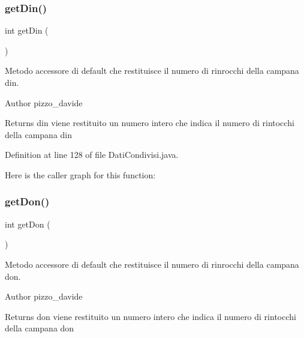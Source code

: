 \subsubsection{\texorpdfstring{get\+Din()}{getDin()}}
{\footnotesize\ttfamily int get\+Din (\begin{DoxyParamCaption}{ }\end{DoxyParamCaption})}



Metodo accessore di default che restituisce il numero di rinrocchi della campana \textquotesingle{}din\textquotesingle{}. 

\begin{DoxyAuthor}{Author}
pizzo\+\_\+davide
\end{DoxyAuthor}
\begin{DoxyReturn}{Returns}
din viene restituito un numero intero che indica il numero di rintocchi della campana \textquotesingle{}din\textquotesingle{} 
\end{DoxyReturn}


Definition at line 128 of file Dati\+Condivisi.\+java.

Here is the caller graph for this function\+:
\mbox{\label{classcampane_1_1_dati_condivisi_a6ba617c5159f591a47f3e48ed45d0cac}} 
\subsubsection{\texorpdfstring{get\+Don()}{getDon()}}
{\footnotesize\ttfamily int get\+Don (\begin{DoxyParamCaption}{ }\end{DoxyParamCaption})}



Metodo accessore di default che restituisce il numero di rinrocchi della campana \textquotesingle{}don\textquotesingle{}. 

\begin{DoxyAuthor}{Author}
pizzo\+\_\+davide
\end{DoxyAuthor}
\begin{DoxyReturn}{Returns}
don viene restituito un numero intero che indica il numero di rintocchi della campana \textquotesingle{}don\textquotesingle{} 
\end{DoxyReturn}



